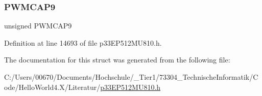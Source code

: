 \mbox{\label{structtag_p_w_m_c_a_p3_b_i_t_s_a9a0cd5d7a58681927adecfd9946b75fb}} 
\subsubsection{\texorpdfstring{P\+W\+M\+C\+A\+P9}{PWMCAP9}}
{\footnotesize\ttfamily unsigned P\+W\+M\+C\+A\+P9}



Definition at line 14693 of file p33\+E\+P512\+M\+U810.\+h.



The documentation for this struct was generated from the following file\+:\begin{DoxyCompactItemize}
\item 
C\+:/\+Users/00670/\+Documents/\+Hochschule/\+\_\+\+Tier1/73304\+\_\+\+Technische\+Informatik/\+Code/\+Hello\+World4.\+X/\+Literatur/\hyperlink{p33_e_p512_m_u810_8h}{p33\+E\+P512\+M\+U810.\+h}\end{DoxyCompactItemize}
